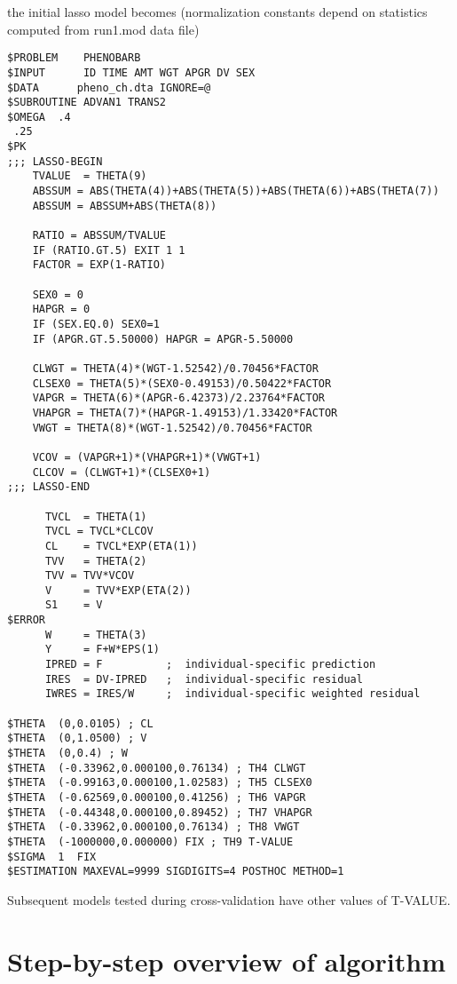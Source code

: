 the initial lasso model becomes (normalization constants depend on statistics computed from run1.mod data file)

\begin{verbatim}
$PROBLEM    PHENOBARB
$INPUT      ID TIME AMT WGT APGR DV SEX
$DATA      pheno_ch.dta IGNORE=@
$SUBROUTINE ADVAN1 TRANS2
$OMEGA  .4
 .25
$PK
;;; LASSO-BEGIN
    TVALUE  = THETA(9)
    ABSSUM = ABS(THETA(4))+ABS(THETA(5))+ABS(THETA(6))+ABS(THETA(7))
    ABSSUM = ABSSUM+ABS(THETA(8))

    RATIO = ABSSUM/TVALUE
    IF (RATIO.GT.5) EXIT 1 1
    FACTOR = EXP(1-RATIO)

    SEX0 = 0
    HAPGR = 0
    IF (SEX.EQ.0) SEX0=1
    IF (APGR.GT.5.50000) HAPGR = APGR-5.50000

    CLWGT = THETA(4)*(WGT-1.52542)/0.70456*FACTOR
    CLSEX0 = THETA(5)*(SEX0-0.49153)/0.50422*FACTOR
    VAPGR = THETA(6)*(APGR-6.42373)/2.23764*FACTOR
    VHAPGR = THETA(7)*(HAPGR-1.49153)/1.33420*FACTOR
    VWGT = THETA(8)*(WGT-1.52542)/0.70456*FACTOR

    VCOV = (VAPGR+1)*(VHAPGR+1)*(VWGT+1)
    CLCOV = (CLWGT+1)*(CLSEX0+1)
;;; LASSO-END

      TVCL  = THETA(1)
      TVCL = TVCL*CLCOV
      CL    = TVCL*EXP(ETA(1))
      TVV   = THETA(2)
      TVV = TVV*VCOV
      V     = TVV*EXP(ETA(2))
      S1    = V
$ERROR
      W     = THETA(3)
      Y     = F+W*EPS(1)
      IPRED = F          ;  individual-specific prediction
      IRES  = DV-IPRED   ;  individual-specific residual
      IWRES = IRES/W     ;  individual-specific weighted residual

$THETA  (0,0.0105) ; CL
$THETA  (0,1.0500) ; V
$THETA  (0,0.4) ; W
$THETA  (-0.33962,0.000100,0.76134) ; TH4 CLWGT
$THETA  (-0.99163,0.000100,1.02583) ; TH5 CLSEX0
$THETA  (-0.62569,0.000100,0.41256) ; TH6 VAPGR
$THETA  (-0.44348,0.000100,0.89452) ; TH7 VHAPGR
$THETA  (-0.33962,0.000100,0.76134) ; TH8 VWGT
$THETA  (-1000000,0.000000) FIX ; TH9 T-VALUE
$SIGMA  1  FIX
$ESTIMATION MAXEVAL=9999 SIGDIGITS=4 POSTHOC METHOD=1
\end{verbatim}

Subsequent models tested during cross-validation have other values of T-VALUE.


\section{Step-by-step overview of algorithm}

